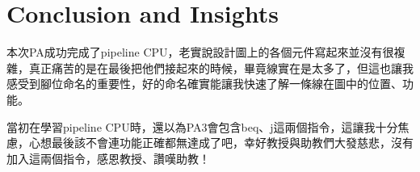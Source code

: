\documentclass[12pt]{article}
\begin{document}
\section{Conclusion and Insights}
本次PA成功完成了pipeline CPU，老實說設計圖上的各個元件寫起來並沒有很複雜，真正痛苦的是在最後把他們接起來的時候，畢竟線實在是太多了，但這也讓我感受到腳位命名的重要性，好的命名確實能讓我快速了解一條線在圖中的位置、功能。
\par
當初在學習pipeline CPU時，還以為PA3會包含beq、j這兩個指令，這讓我十分焦慮，心想最後該不會連功能正確都無達成了吧，幸好教授與助教們大發慈悲，沒有加入這兩個指令，感恩教授、讚嘆助教！
\end{document}
